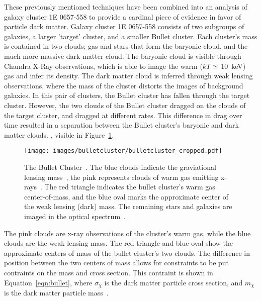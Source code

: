     These previously mentioned techniques have been combined into an analysis of galaxy cluster 1E 0657-558 to provide a cardinal piece of evidence in favor of particle dark matter.
    Galaxy cluster 1E 0657-558 consists of two subgroups of galaxies, a larger 'target' cluster, and a smaller Bullet cluster.
    Each cluster's mass is contained in two clouds; gas and stars that form the baryonic cloud, and the much more massive dark matter cloud.
    The baryonic cloud is visible through Chandra X-Ray observations, which is able to image the warm ($kT\simeq\,$\SI{10}{keV}) gas and infer its density.
    The dark matter cloud is inferred through weak lensing observations, where the mass of the cluster distorts the images of background galaxies.
    In this pair of clusters, the Bullet cluster has fallen through the target cluster.
    However, the two clouds of the Bullet cluster dragged on the clouds of the target cluster, and dragged at different rates.
    This difference in drag over time resulted in a separation between the Bullet cluster's baryonic and dark matter clouds.
    , visible in Figure~\ref{fig:bullet}.

    \begin{figure}[ht]
      \centering
      \texttt{[image: images/bulletcluster/bulletcluster\_cropped.pdf]}
      \caption[The Bullet Cluster]{
        The Bullet Cluster~\cite{bullet_cluster_combined_image}.
        The blue clouds indicate the graviational lensing mass~\cite{bullet_cluster}, the pink represents clouds of warm gas emitting x-rays~\cite{bullet_cluster_chandramap}.
        The red triangle indicates the bullet cluster's warm gas center-of-mass, and the blue oval marks the approximate center of the weak lensing (dark) mass.
        The remaining stars and galaxies are imaged in the optical spectrum~\cite{bullet_cluster_composite}.}
      \label{fig:bullet}
    \end{figure}
    
    The pink clouds are x-ray observations of the cluster's warm gas, while the blue clouds are the weak lensing mass.
    The red triangle and blue oval show the approximate centers of mass of the bullet cluster's two clouds.
    The difference in position between the two centers of mass allows for constraints to be put contraints on the mass and cross section.
    This contraint is shown in Equation~\ref{eqn:bullet}, where $\sigma_{\chi}$ is the dark matter particle cross section, and $m_{\chi}$ is the dark matter particle mass~\cite{bullet_cluster,bullet_cluster2}.
    
